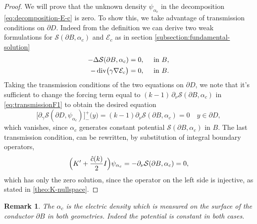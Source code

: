 \documentclass[10pt, a4paper, twoside, openright]{book}
\theoremstyle{definition}
\theoremstyle{plain}
\theoremstyle{plain}
\theoremstyle{plain}
\theoremstyle{plain}
\newtheorem{remark}[subsection]{Remark}
\theoremstyle{plain}
\theoremstyle{plain}
\theoremstyle{plain}
\theoremstyle{plain}
\DeclareMathOperator{\divergence}{div}
\begin{document}
\begin{proof}
We will prove that the unknown density $\psi_{\alpha_c}$ in the decomposition \eqref{eq:decomposition-E-c} is zero. 
To show this, we take advantage of transmission conditions on $\partial D$. 
Indeed from the definition we can derive two weak formulations for 
$\mathcal{S}(\partial B, \alpha_c)$ and $\mathcal{E}_c$ 
as in section \ref{subsection:fundamental-solution}
\begin{align}
 -\Delta\mathcal{S}(\partial B,\alpha_c) &= 0,\quad\textup{ in }B,\\
 -\divergence\bigl(\gamma\nabla\mathcal{E}_c\bigr) &= 0,\quad\textup{ in }B.
\end{align}
Taking the transmission conditions of the two equations on $\partial D$, we note that it's sufficient to change the forcing term equal to $(k-1)\,\partial_\nu\mathcal{S}(\partial B, \alpha_{c})$ in \eqref{eq:transmissionF1} to obtain the desired equation
\begin{equation}
 \bigl[\partial_\gamma \mathcal{S}(\partial D,\psi_{\alpha_{c}})\bigr]^+_-\bigl(y\bigr) = (k - 1)\partial_\nu \mathcal{S}(\partial B,\alpha_{c})=0 \quad y \in\partial D,
\end{equation}
which vanishes, since $\alpha_{c}$ generates constant potential $\mathcal{S}(\partial B,\alpha_{c})$ in $B$. The last transmission condition, can be rewritten, by substitution of integral boundary operators,
\begin{equation}
 \Bigl(K' + \frac{\hat{c}(k)}{2} I\Bigr)\psi_{\alpha_c} = -\partial_\nu \mathcal{S}(\partial B, \alpha_c) = 0,
\end{equation}
which has only the zero solution, since the operator on the left side is injective, as stated in \ref{theo:K-nullspace}.
\end{proof}
\begin{remark}
 The $\alpha_c$ is the electric density which is measured on the surface of the conductor $\partial B$ in both geometries. Indeed the potential is constant in both cases.
\end{remark}
\end{document}
